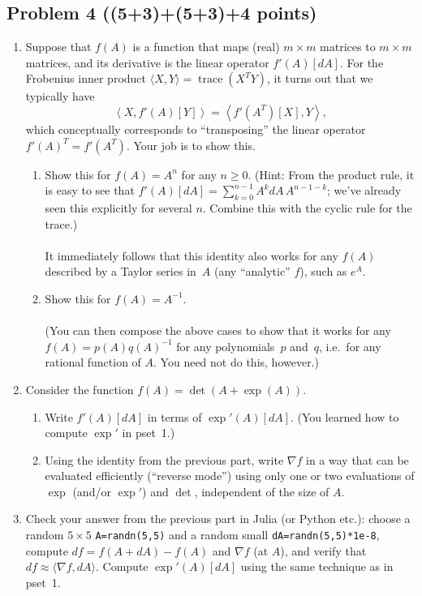 \documentclass[10pt,oneside]{article}
\newcommand{\tr}{\operatorname{trace}}
\begin{document}
\subsection*{Problem 4 ((5+3)+(5+3)+4 points)}
\begin{enumerate}
\item Suppose that $f(A)$ is a function that maps (real) $m\times m$ matrices
to $m\times m$ matrices, and its derivative is the linear operator
$f'(A)[dA]$. For the Frobenius inner product $\langle X,Y\rangle=\tr(X^{T}Y)$,
it turns out that we typically have 
\[
\left\langle X,f'(A)[Y]\right\rangle =\left\langle f'(A^{T})[X],Y\right\rangle ,
\]
which conceptually corresponds to “transposing” the linear operator
$f'(A)^{T}=f'(A^{T})$. Your job is to show this.
\begin{enumerate}
\item Show this for $f(A)=A^{n}$ for any $n\ge0$. (Hint: From the product
rule, it is easy to see that $f'(A)[dA]=\sum_{k=0}^{n-1}A^{k}dA\,A^{n-1-k}$;
we've already seen this explicitly for several $n$. Combine this
with the cyclic rule for the trace.)\\
\\
It immediately follows that this identity also works for any $f(A)$
described by a Taylor series in~$A$ (any ``analytic'' $f$), such
as $e^{A}$.
\item Show this for $f(A)=A^{-1}$.\\
\\
(You can then compose the above cases to show that it works for any
$f(A)=p(A)q(A)^{-1}$ for any polynomials~$p$ and~$q$, i.e.~for
any rational function of $A$. You need not do this, however.)
\end{enumerate}
\item Consider the function $f(A)=\det(A+\exp(A))$.
\begin{enumerate}
\item Write $f'(A)[dA]$ in terms of $\exp'(A)[dA]$. (You learned how to
compute $\exp'$ in pset~1.)
\item Using the identity from the previous part, write $\nabla f$ in a
way that can be evaluated efficiently (“reverse mode”) using
only one or two evaluations of $\exp$ (and/or $\exp'$) and $\det$,
independent of the size of $A$.
\end{enumerate}
\item Check your answer from the previous part in Julia (or Python etc.):
choose a random $5\times5$ \texttt{A=randn(5,5)} and a random small
\texttt{dA=randn(5,5){*}1e-8}, compute $df=f(A+dA)-f(A)$ and $\nabla f$
(at $A$), and verify that $df\approx\langle\nabla f,dA\rangle$.
Compute $\exp'(A)[dA]$ using the same technique as in pset~1.
\end{enumerate}
\end{document}
